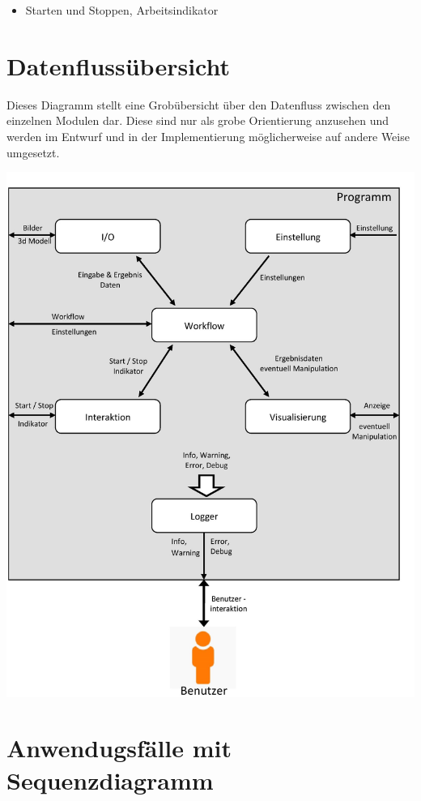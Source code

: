\begin{itemize}
\item Starten und Stoppen, Arbeitsindikator 
\end{itemize}

\newpage 
\section{Datenflussübersicht}

Dieses Diagramm stellt eine Grobübersicht über den Datenfluss zwischen den einzelnen Modulen dar.
Diese sind nur als grobe Orientierung anzusehen und werden im Entwurf und in der Implementierung möglicherweise auf andere Weise umgesetzt.
\begin{normalsize}

\end{normalsize}
\includegraphics[scale=0.28]{img/Datenflussuebersicht.jpg} 
\newpage 
\section{Anwendugsfälle mit Sequenzdiagramm}
